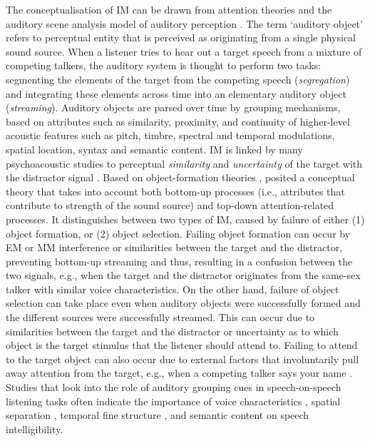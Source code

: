 \documentclass[a4paper, twoside]{templates/ociamthesis}
\begin{document}
The conceptualisation of IM can be drawn from attention theories and the auditory scene analysis model of auditory perception \autocite[ASA;][]{Bergman1990}. The term `auditory object' refers to perceptual entity that is perceived as originating from a single physical sound source. When a listener tries to hear out a target speech from a mixture of competing talkers, the auditory system is thought to perform two tasks: segmenting the elements of the target from the competing speech (\textit{segregation}) and integrating these elements across time into an elementary auditory object (\textit{streaming}). Auditory objects are parsed over time by grouping mechanisms, based on attributes such as similarity, proximity, and continuity of higher-level acoustic features such as pitch, timbre, spectral and temporal modulations, spatial location, syntax and semantic content. IM is linked by many psychoacoustic studies to perceptual \textit{similarity} and \textit{uncertainty} of the target with the distractor signal \autocites[e.g.,][]{Watson1987,Kidd2002,Durlach2003,Shinn-Cunningham2008}. Based on object-formation theories \autocite[e.g., ASA;][]{Bergman1990}, \textcite{Shinn-Cunningham2008} posited a conceptual theory that takes into account both bottom-up processes (i.e., attributes that contribute to strength of the sound source) and top-down attention-related processes. It distinguishes between two types of IM, caused by failure of either (1) object formation, or (2) object selection. Failing object formation can occur by EM or MM interference or similarities between the target and the distractor, preventing bottom-up streaming and thus, resulting in a confusion between the two signals, e.g., when the target and the distractor originates from the same-sex talker with similar voice characteristics. On the other hand, failure of object selection can take place even when auditory objects were successfully formed and the different sources were successfully streamed. This can occur due to similarities between the target and the distractor or uncertainty as to which object is the target stimulus that the listener should attend to. Failing to attend to the target object can also occur due to external factors that involuntarily pull away attention from the target, e.g., when a competing talker says your name \autocite{Moray1959}.\\

Studies that look into the role of auditory grouping cues in speech-on-speech listening tasks often indicate the importance of voice characteristics \autocites[such as voice pitch or fundamental frequency;][]{Scheffers1983,Bergman1990,Brungart2001,Darwin2003,Leclere2017,Shen2017}, spatial separation \autocite{Freyman1999,Best2011}, temporal fine structure \autocite[TFS;][]{Moore2008}, and semantic content \autocite{VanEngen2007,Calandruccio2010,Brouwer2012} on speech intelligibility.\\
\end{document}
